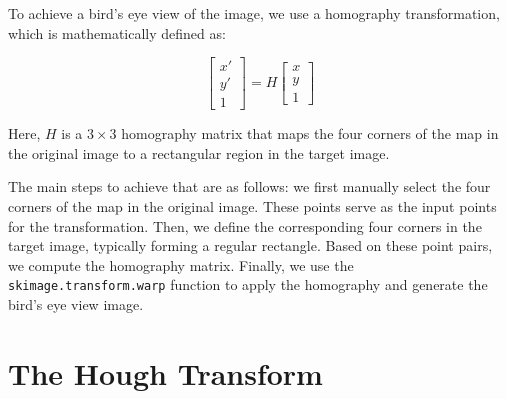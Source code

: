 \documentclass[12pt]{article}
\begin{document}
To achieve a bird's eye view of the image, we use a homography transformation, which is mathematically defined as:

\[
\begin{bmatrix}
x' \\
y' \\
1
\end{bmatrix}
=
H
\begin{bmatrix}
x \\
y \\
1
\end{bmatrix}
\]

Here, \( H \) is a \( 3 \times 3 \) homography matrix that maps the four corners of the map in the original image to a rectangular region in the target image.

The main steps to achieve that are as follows: we first manually select the four corners of the map in the original image. These points serve as the input points for the transformation. Then, we define the corresponding four corners in the target image, typically forming a regular rectangle. Based on these point pairs, we compute the homography matrix. Finally, we use the \texttt{skimage.transform.warp} function to apply the homography and generate the bird's eye view image.

\section{The Hough Transform}
\end{document}
